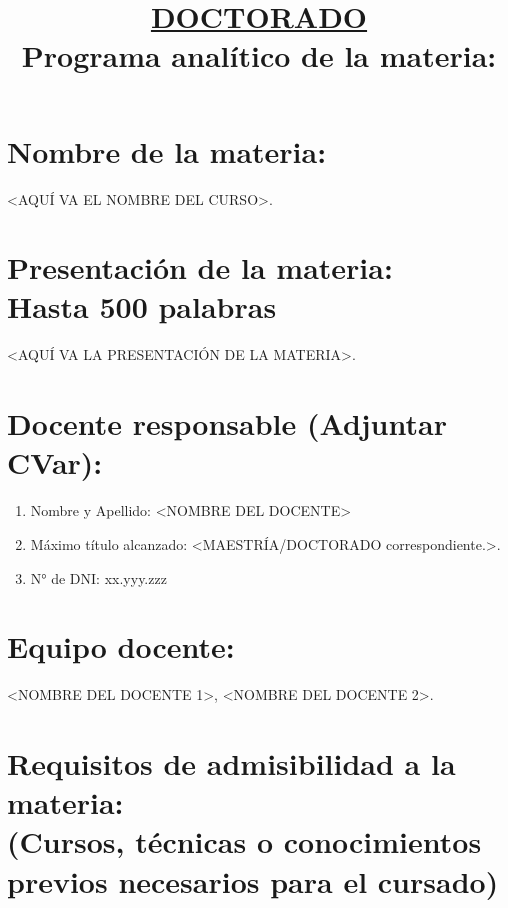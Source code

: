 \documentclass[a4paper,12pt]{article}
\title{\underline{\LARGE DOCTORADO} \\ {\normalsize Programa analítico de la materia:}}
\author{}
\date{}
\begin{document}
\fancyhead{} %
\renewcommand{\headrulewidth}{0pt}
\fancyfoot[C]{\thepage}
\maketitle
\thispagestyle{fancy}
\pagestyle{fancy}
\section{{Nombre de la materia:} }

<AQUÍ VA EL NOMBRE DEL CURSO>.

\section{Presentación de la materia:\\{\tiny{\normalfont Hasta 500 palabras}}}

<AQUÍ VA LA PRESENTACIÓN DE LA MATERIA>.

\section{Docente responsable (Adjuntar CVar):}
\begin{enumerate}[label=\alph*-]
    \item Nombre y Apellido: <NOMBRE DEL DOCENTE>
    \item Máximo título alcanzado: <MAESTRÍA/DOCTORADO correspondiente.>.
    \item N° de DNI: xx.yyy.zzz
\end{enumerate}
\section{Equipo docente:}
<NOMBRE DEL DOCENTE 1>, <NOMBRE DEL DOCENTE 2>.
\section{
Requisitos de admisibilidad a la materia: \\
{\tiny{\normalfont (Cursos, técnicas o conocimientos previos necesarios para el cursado)}}}
\end{document}
